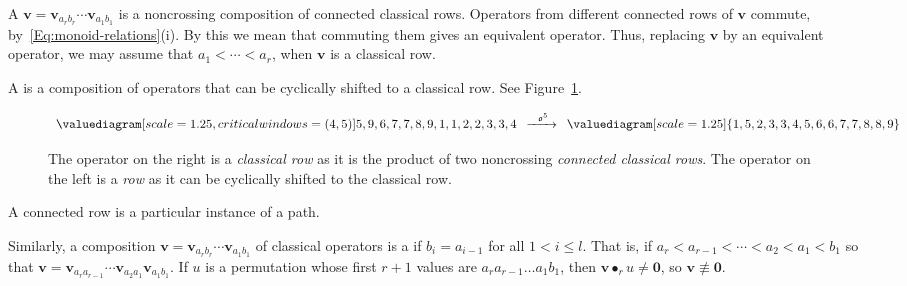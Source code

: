 \documentclass[12pt,oneside,reqno]{amsart}
\theoremstyle{definition}
\numberwithin{equation}{section}
\newcommand{\qv}{{\mathbf v}}
\newcommand{\bzero}{{\mathbf 0}}
\DeclareMathOperator{\kactionop}{{\scriptstyle \bullet}}
\newcommand{\defcolor}[1]{{\color{RoyalBlue}#1}}
\newcommand{\demph}[1]{\defcolor{{\sl #1}}}
\newcommand{\ncycle}{\mathfrak o}
\begin{document}
A \demph{classical row}  $\qv = \qv_{a_r b_r}\dotsb\qv_{a_1 b_1}$ is a noncrossing composition of connected classical rows.
Operators from different connected rows of $\qv$ commute, by~\eqref{Eq:monoid-relations}(i).
By this we mean that commuting them gives an equivalent operator.
Thus, replacing $\qv$ by an equivalent operator, we may assume that $a_1<\dotsb<a_r$, when $\qv$ is a classical row.

A \demph{row} is a composition of operators that can be cyclically shifted to a classical row.
See Figure~\ref{fig:column-vs-classical-row}.
\begin{figure}[htpb]
    \centering
    \begin{equation*}
        \begin{array}{c}
            \valuediagram[scale=1.25, critical windows={(4,5)}]{{5,9},{6,7},{7,8},{9,1},{1,2},{2,3},{3,4}}
        \end{array}
        \xrightarrow{~~\ncycle^5~}
        \begin{array}{c}
            \valuediagram[scale=1.25]{{1,5},{2,3},{3,4},{5,6},{6,7},{7,8},{8,9}}
        \end{array}
    \end{equation*}
    \caption{The operator on the right is a \emph{classical row} as it is the product
        of two noncrossing \emph{connected classical rows}.
        The operator on the left is a \emph{row} as it can be cyclically
    shifted to the classical row.}
    \label{fig:column-vs-classical-row}
\end{figure}
A connected row is a particular instance of a path.


Similarly, a composition $\qv = \qv_{a_r b_r}\dotsb\qv_{a_1 b_1}$ of classical operators is a \demph{connected classical column} if
$b_{i} = a_{i-1}$ for all $1 < i \leq l$.
That is, if $a_r < a_{r-1} < \cdots < a_2 < a_1 < b_1$ so that
$\qv=\qv_{a_ra_{r-1}}\dotsb\qv_{a_2a_1}\qv_{a_1b_1}$.
If $u$ is a permutation whose first $r+1$ values are $a_ra_{r-1}\dotsc a_1b_1$, then $\qv\kactionop_r u\neq\bzero$, so $\qv\not\equiv\bzero$.
\end{document}
